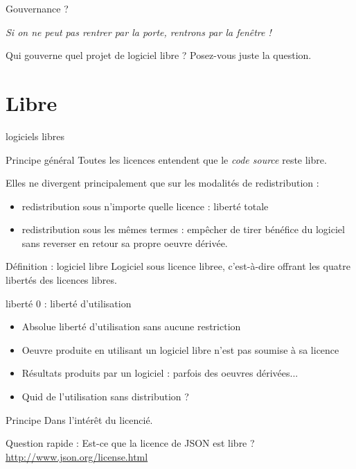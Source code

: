 \documentclass{beamer}
\begin{document}
\begin{frame}{Gouvernance ?}
  
\textit{Si on ne peut pas rentrer par la porte, rentrons par la fenêtre !}

Qui gouverne quel projet de logiciel libre ? Posez-vous juste la question.

\end{frame}

\section{Libre}


\begin{frame}{logiciels libres}

  \begin{alertblock}{Principe général}
    Toutes les licences entendent que le \textit{code source} reste libre.
  \end{alertblock}
  Elles ne divergent principalement que sur les modalités de redistribution :
  \begin{itemize}
  \item redistribution sous n'importe quelle licence : liberté totale
  \item redistribution sous les mêmes termes : empêcher de tirer bénéfice du logiciel sans reverser en retour sa propre oeuvre dérivée.
  \end{itemize}

  \begin{alertblock}{Définition : logiciel libre}
    Logiciel sous licence libree, c'est-à-dire offrant les quatre libertés des licences libres.    
  \end{alertblock}
  
\end{frame}



\begin{frame}{liberté 0 : liberté d'utilisation}
  \begin{itemize}
  \item Absolue liberté d'utilisation sans aucune restriction
  \item Oeuvre produite en utilisant un logiciel libre n'est pas soumise à sa licence
  \item Résultats produits par un logiciel : parfois des oeuvres dérivées...
  \item Quid de l'utilisation sans distribution ?
  \end{itemize}

  \begin{alertblock}{Principe}
    Dans l'intérêt du licencié.
  \end{alertblock}
  
  Question rapide : Est-ce que la licence de JSON est libre ? \url{http://www.json.org/license.html}

\end{frame}
\end{document}
